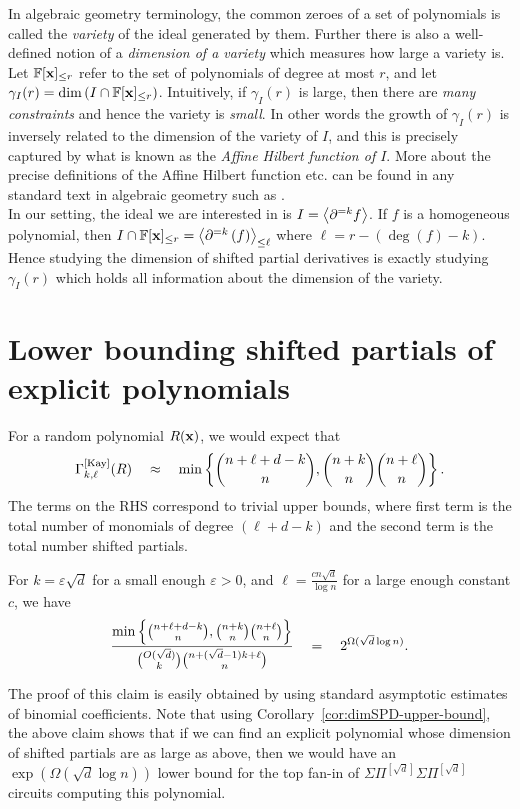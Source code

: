 \documentclass[12pt]{report}
\newcommand{\CM}[1]{\Gamma^{\mathrm{[#1]}}}
\newcommand{\SPD}[3]{\inangle{\partial^{=#1}\inparen{#3}}_{\leq #2}}
\newcommand{\mySPSP}[2]{\Sigma\Pi^{[#1]}\Sigma\Pi^{[#2]}}
\renewcommand{\epsilon}{\varepsilon}
\begin{document}
In algebraic geometry terminology, the common zeroes of a set of polynomials is called the \emph{variety} of the ideal generated by them. Further there is also a well-defined notion of a \emph{dimension of a variety} which measures how large a variety is. Let $\mathbb{F}[\mathbf{x}]_{\leq r}$ refer to the set of polynomials of degree at most $r$, and let $\gamma_I(r) = \dim \left(I \cap \mathbb{F}[\mathbf{x}]_{\leq r}\right)$. Intuitively, if $\gamma_I(r)$ is large, then there are \emph{many constraints} and hence the variety is \emph{small}. In other words the growth of $\gamma_I(r)$ is inversely related to the dimension of the variety of $I$, and this is precisely captured by what is known as the \emph{Affine Hilbert function of $I$}. More about the precise definitions of the Affine Hilbert function etc. can be found in any standard text in algebraic geometry such as \cite{clo}. \\

In our setting, the ideal we are interested in is $I = \left\langle\partial^{=k}f\right\rangle$. If $f$ is a homogeneous polynomial, then $I \intersection \F[\vecx]_{\leq r} = \SPD{k}{\ell}{f}$ where $\ell = r - (\deg(f) - k)$. Hence studying the dimension of shifted partial derivatives is exactly studying $\gamma_I(r)$ which holds all information about the dimension of the variety. 

\section{Lower bounding shifted partials of explicit polynomials}

For a random polynomial $R(\mathbf{x})$, we would expect that
$$
\CM{Kay}_{k,\ell}(R) \spaced{\approx} \min\inbrace{\binom{n + \ell + d -k}{n}, \binom{n+k}{n} \binom{n+\ell}{n}}.
$$
The terms on the RHS correspond to trivial upper bounds, where first term is the total number of monomials of degree $(\ell + d-k)$ and the second term is the total number shifted partials.  

\begin{claim}\label{clm:spd-ratio}
For $k = \epsilon \sqrt{d}$ for a small enough $\epsilon > 0$, and $\ell = \frac{c n\sqrt{d}}{\log n}$ for a large enough constant $c$, we have
$$
\frac{\min\left\{\binom{n + \ell + d -k}{n}, \binom{n+k}{n} \binom{n+\ell}{n}\right\}}{\binom{O(\sqrt{d})}{k}\binom{n + (\sqrt{d}-1)k + \ell}{n}} \quad = \quad 2^{\Omega(\sqrt{d}\log n)}.
$$
\end{claim}

The proof of this claim is easily obtained by using standard asymptotic estimates of binomial coefficients. Note that using Corollary~\ref{cor:dimSPD-upper-bound}, the above claim shows that if we can find an explicit polynomial whose dimension of shifted partials are as large as above, then we would have an $\exp(\Omega(\sqrt{d}\log n))$ lower bound for the top fan-in of $\mySPSP{\sqrt{d}}{\sqrt{d}}$ circuits computing this polynomial.\\
\end{document}
